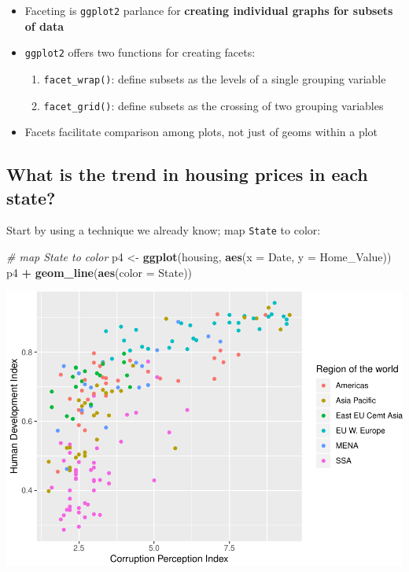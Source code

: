 \documentclass[
]{book}
\newenvironment{Shaded}{\begin{snugshade}}{\end{snugshade}}
\newcommand{\CommentTok}[1]{\textcolor[rgb]{0.56,0.35,0.01}{\textit{#1}}}
\newcommand{\DataTypeTok}[1]{\textcolor[rgb]{0.13,0.29,0.53}{#1}}
\newcommand{\KeywordTok}[1]{\textcolor[rgb]{0.13,0.29,0.53}{\textbf{#1}}}
\newcommand{\NormalTok}[1]{#1}
\newcommand{\OperatorTok}[1]{\textcolor[rgb]{0.81,0.36,0.00}{\textbf{#1}}}
\newcommand{\StringTok}[1]{\textcolor[rgb]{0.31,0.60,0.02}{#1}}
\providecommand{\tightlist}{%
  \setlength{\itemsep}{0pt}\setlength{\parskip}{0pt}}
\begin{document}
\begin{itemize}
\tightlist
\item
  Faceting is \texttt{ggplot2} parlance for \textbf{creating individual graphs for subsets of data}
\item
  \texttt{ggplot2} offers two functions for creating facets:

  \begin{enumerate}
  \def\labelenumi{\arabic{enumi}.}
  \tightlist
  \item
    \texttt{facet\_wrap()}: define subsets as the levels of a single grouping variable
  \item
    \texttt{facet\_grid()}: define subsets as the crossing of two grouping variables
  \end{enumerate}
\item
  Facets facilitate comparison among plots, not just of geoms within a plot
\end{itemize}

\hypertarget{what-is-the-trend-in-housing-prices-in-each-state}{%
\subsection{What is the trend in housing prices in each state?}\label{what-is-the-trend-in-housing-prices-in-each-state}}

Start by using a technique we already know; map \texttt{State} to color:

\begin{Shaded}
\begin{Highlighting}[]
\CommentTok{\# map \textasciigrave{}State\textasciigrave{} to color}
\NormalTok{p4 \textless{}{-}}\StringTok{ }\KeywordTok{ggplot}\NormalTok{(housing, }\KeywordTok{aes}\NormalTok{(}\DataTypeTok{x =}\NormalTok{ Date, }\DataTypeTok{y =}\NormalTok{ Home\_Value))}
\NormalTok{p4 }\OperatorTok{+}\StringTok{ }\KeywordTok{geom\_line}\NormalTok{(}\KeywordTok{aes}\NormalTok{(}\DataTypeTok{color =}\NormalTok{ State))  }
\end{Highlighting}
\end{Shaded}

\includegraphics{R/Rgraphics/figures/unnamed-chunk-208-1.pdf}
\end{document}
